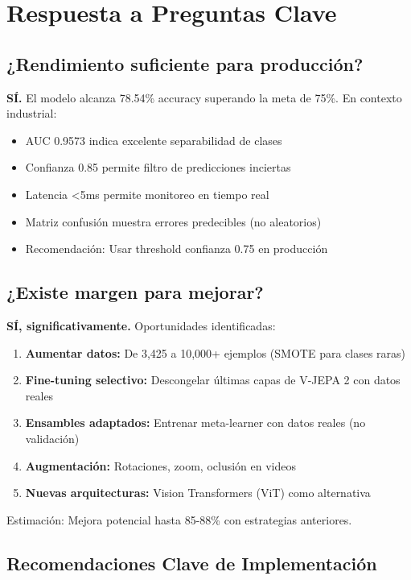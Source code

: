 \documentclass[11pt,letterpaper]{article}
\begin{document}
\section{Respuesta a Preguntas Clave}

\subsection{¿Rendimiento suficiente para producción?}

\textbf{SÍ.} El modelo alcanza 78.54\% accuracy superando la meta de 75\%. En contexto industrial:
\begin{itemize}
  \item AUC 0.9573 indica excelente separabilidad de clases
  \item Confianza 0.85 permite filtro de predicciones inciertas
  \item Latencia <5ms permite monitoreo en tiempo real
  \item Matriz confusión muestra errores predecibles (no aleatorios)
  \item Recomendación: Usar threshold confianza 0.75 en producción
\end{itemize}

\subsection{¿Existe margen para mejorar?}

\textbf{SÍ, significativamente.} Oportunidades identificadas:

\begin{enumerate}
  \item \textbf{Aumentar datos:} De 3,425 a 10,000+ ejemplos (SMOTE para clases raras)
  \item \textbf{Fine-tuning selectivo:} Descongelar últimas capas de V-JEPA 2 con datos reales
  \item \textbf{Ensambles adaptados:} Entrenar meta-learner con datos reales (no validación)
  \item \textbf{Augmentación:} Rotaciones, zoom, oclusión en videos
  \item \textbf{Nuevas arquitecturas:} Vision Transformers (ViT) como alternativa
\end{enumerate}

Estimación: Mejora potencial hasta 85-88\% con estrategias anteriores.

\subsection{Recomendaciones Clave de Implementación}
\end{document}
